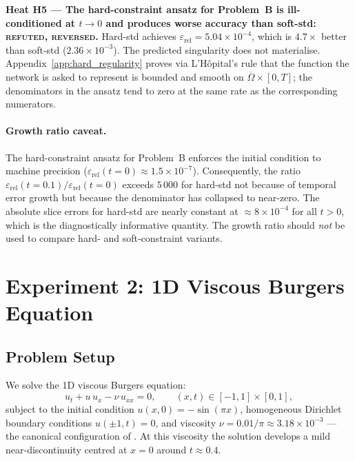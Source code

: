 \documentclass{article}
\newcommand{\relL}{\varepsilon_{\mathrm{rel}}}
\begin{document}
\textbf{Heat H5 — The hard-constraint ansatz for Problem~B is ill-conditioned at
$t\to0$ and produces worse accuracy than soft-std: \textsc{refuted, reversed}.}
Hard-std achieves $\relL = 5.04\times10^{-4}$, which is $4.7\times$ better
than soft-std ($2.36\times10^{-3}$).
The predicted singularity does not materialise.
Appendix~\ref{app:hard_regularity} proves via L'H\^opital's rule that the
function the network is asked to represent is bounded and smooth on
$\overline{\Omega}\times[0,T]$; the denominators in the ansatz tend to zero
at the same rate as the corresponding numerators.

\paragraph{Growth ratio caveat.}
The hard-constraint ansatz for Problem~B enforces the initial condition to
machine precision ($\relL(t{=}0) \approx 1.5\times10^{-7}$).
Consequently, the ratio $\relL(t{=}0.1)/\relL(t{=}0)$ exceeds $5\,000$ for
hard-std not because of temporal error growth but because the denominator has
collapsed to near-zero.
The absolute slice errors for hard-std are nearly constant at
$\approx 8\times10^{-4}$ for all $t > 0$, which is the diagnostically
informative quantity.
The growth ratio should \emph{not} be used to compare hard- and
soft-constraint variants.

\section{Experiment 2: 1D Viscous Burgers Equation}
\label{sec:burgers}

\subsection{Problem Setup}

We solve the 1D viscous Burgers equation:
\begin{equation}
  u_t + u\,u_x - \nu\,u_{xx} = 0, \qquad
  (x,t) \in [-1,1]\times[0,1],
\label{eq:burgers}
\end{equation}
subject to the initial condition $u(x,0) = -\sin(\pi x)$, homogeneous Dirichlet
boundary conditions $u(\pm1,t) = 0$, and viscosity $\nu = 0.01/\pi \approx
3.18\times10^{-3}$ — the canonical configuration of \citet{raissi2019}.
At this viscosity the solution develops a mild near-discontinuity centred at
$x = 0$ around $t \approx 0.4$.
\end{document}
